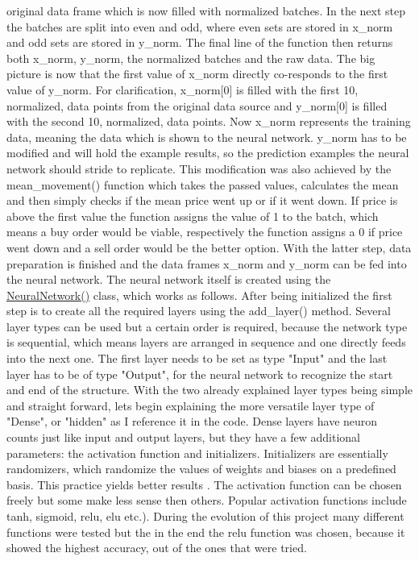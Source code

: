 \documentclass{article}
\begin{document}
original data frame which is now filled with normalized batches. In the next step the batches are split into even and odd, where even sets are stored in x\_norm and odd sets are stored in y\_norm. The final line of the function then returns both x\_norm, y\_norm, the normalized batches and the raw data. The big picture is now that the first value of x\_norm directly co-responds to the first value of y\_norm. For clarification, x\_norm[0] is filled with the first 10, normalized, data points from the original data source and y\_norm[0] is filled with the second 10, normalized, data points. Now x\_norm represents the training data, meaning the data which is shown to the neural network. y\_norm has to be modified and will hold the example results, so the prediction examples the neural network should stride to replicate. This modification was also achieved by the mean\_movement() function which takes the passed values, calculates the mean and then simply checks if the mean price went up or if it went down. If price is above the first value the function assigns the value of 1 to the batch, which means a buy order would be viable, respectively the function assigns a 0 if price went down and a sell order would be the better option. With the latter step, data preparation is finished and the data frames x\_norm and y\_norm can be fed into the neural network. The neural network itself is created using the \href{https://colab.research.google.com/drive/1KucTlScag3R0D2piUODHtQ1eAmDSQ2Rv#scrollTo=jxYWLBJjbARf}{NeuralNetwork()} class, which works as follows. After being initialized the first step is to create all the required layers using the add\_layer() method. Several layer types can be used but a certain order is required, because the network type is sequential, which means layers are arranged in sequence and one directly feeds into the next one. The first layer needs to be set as type "Input" and the last layer has to be of type "Output", for the neural network to recognize the start and end of the structure. With the two already explained layer types being simple and straight forward, lets begin explaining the more versatile layer type of "Dense", or "hidden" as I reference it in the code. Dense layers have neuron counts just like input and output layers, but they have a few additional parameters: the activation function and initializers. Initializers are essentially randomizers, which randomize the values of weights and biases on a predefined basis. This practice yields better results \cite{init}. The activation function can be chosen freely but some make less sense then others. Popular activation functions include tanh, sigmoid, relu, elu etc.\cite{activation}). During the evolution of this project many different functions were tested but the in the end the relu function was chosen, because it showed the highest accuracy, out of the ones that were tried.
\end{document}
